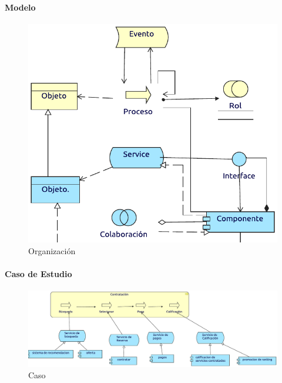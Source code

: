 \paragraph{Modelo}
\begin{figure}[h!]
	\centering
	\includegraphics[width=0.9\linewidth]{Desarrollo/ArquitecturaEmpresarial/Aplicacion/imgs/uso.pdf}
	\caption{Organización}
\end{figure}
\newpage
\paragraph{Caso de Estudio}

\begin{figure}[h!]
	\centering
	\includegraphics[width=\linewidth]{Desarrollo/ArquitecturaEmpresarial/Aplicacion/imgs/usoMetamodelo.pdf}
	\caption{Caso}
\end{figure}